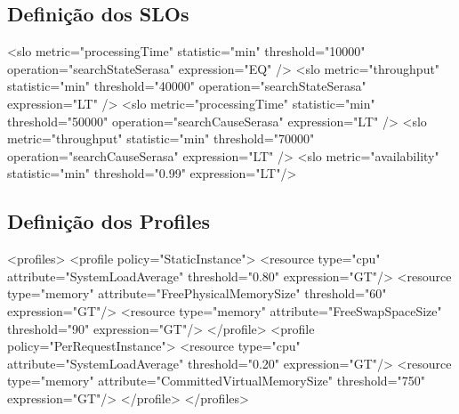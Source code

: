 \subsection{Definição dos SLOs}
\label{subsec:slo}
\small
\begin{verbatimtab}[4]
<slo metric="processingTime" statistic="min" threshold="10000"  
	operation="searchStateSerasa" expression="EQ" />
<slo metric="throughput"     statistic="min" threshold="40000"  
	operation="searchStateSerasa" expression="LT" />
<slo metric="processingTime" statistic="min" threshold="50000"  
	operation="searchCauseSerasa" expression="LT" />
<slo metric="throughput"     statistic="min" threshold="70000" 
	operation="searchCauseSerasa" expression="LT" />
<slo metric="availability"   statistic="min" threshold="0.99"   
	expression="LT"/>
\end{verbatimtab}


\subsection{Definição dos Profiles}
\small
\begin{verbatimtab}[4]
<profiles>
	<profile policy="StaticInstance">
		<resource type="cpu" 	attribute="SystemLoadAverage" 
			threshold="0.80" expression="GT"/>
		<resource type="memory" attribute="FreePhysicalMemorySize" 
			threshold="60" expression="GT"/>
		<resource type="memory" attribute="FreeSwapSpaceSize" 
			threshold="90" expression="GT"/>
	</profile>
	<profile policy="PerRequestInstance">
		<resource type="cpu" 	attribute="SystemLoadAverage" 
			threshold="0.20" expression="GT"/>
		<resource type="memory" attribute="CommittedVirtualMemorySize" 
			threshold="750" expression="GT"/>
	</profile>
</profiles>
\end{verbatimtab}
